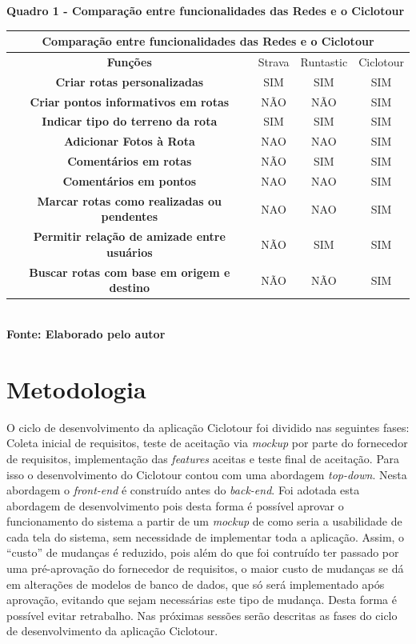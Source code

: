    \begin{center}
          \centering
       	\textbf{Quadro 1 - Comparação entre funcionalidades das Redes e o Ciclotour}\\
        \label{quadro1}
	\begin{tabular}{|c|c|c|c|} \hline
	\multicolumn{4}{|c|}{\textbf{Comparação entre funcionalidades das Redes e o Ciclotour }} 	  \\
		\hline \textbf{ Funções } & Strava & Runtastic & Ciclotour \\  
		\hline \textbf{ Criar rotas personalizadas } & SIM & SIM & SIM \\ 
		\hline \textbf{ Criar pontos informativos em rotas } & NÃO & NÃO & SIM  \\
		\hline \textbf{ Indicar tipo do terreno da rota } & SIM & SIM & SIM \\ 
		\hline \textbf{	Adicionar Fotos à Rota } & NAO & NAO & SIM \\ 
		\hline \textbf{ Comentários em rotas }	& NÃO & SIM & SIM \\ 
		\hline \textbf{	Comentários em pontos } & NAO & NAO & SIM \\ 
		\hline \textbf{	Marcar rotas como realizadas ou pendentes } & NAO & NAO & SIM \\ 
		\hline \textbf{	Permitir relação de amizade entre usuários } & NÃO & SIM & SIM \\ 
		\hline \textbf{	Buscar rotas com base em origem e destino } & NÃO & NÃO & SIM \\ 
		\hline
	\end{tabular}
	\vspace{0.1cm} 
	{\footnotesize\\ \textbf{Fonte: Elaborado pelo autor}}
   \end{center}

\section{\esp Metodologia}
O ciclo de desenvolvimento da aplicação Ciclotour foi dividido nas seguintes fases: Coleta inicial de requisitos, teste de aceitação via 
\textit{mockup} por parte do fornecedor de requisitos, implementação das \textit{features} aceitas e teste final de aceitação. Para isso 
o desenvolvimento do Ciclotour contou com uma abordagem \textit{top-down}. Nesta abordagem o \textit{front-end} é construído antes do 
\textit{back-end}. Foi adotada esta abordagem de desenvolvimento pois desta forma é possível aprovar o funcionamento do sistema a partir de um 
\textit{mockup} de como seria a usabilidade de cada tela do sistema, sem necessidade de implementar toda a aplicação. Assim, o ``custo'' de mudanças 
é reduzido, pois além do que foi contruído ter passado por uma pré-aprovação do fornecedor de requisitos, o maior custo de mudanças se dá em 
alterações de modelos de banco de dados, que só será implementado após aprovação, evitando que sejam necessárias este tipo de mudança. Desta forma é 
possível evitar retrabalho. Nas próximas sessões serão descritas as fases do ciclo de desenvolvimento da aplicação Ciclotour.

